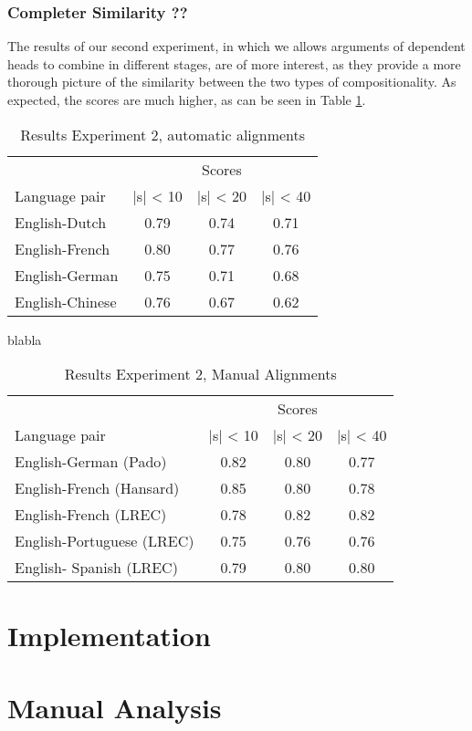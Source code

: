 \documentclass{report}
\begin{document}
\subsection{Completer Similarity ??}

The results of our second experiment, in which we allows arguments of dependent heads to combine in different stages, are of more interest, as they provide a more thorough picture of the similarity between the two types of compositionality. As expected, the scores are much higher, as can be seen in Table \ref{tab:scores3}.

\begin{table}[!h]
\centering
\begin{tabular}{l|ccc}
& \multicolumn{3}{c}{Scores}\\
Language pair & |s| < 10 & |s| < 20 & |s| < 40\\
\hline
English-Dutch & 0.79 & 0.74 & 0.71 \\
English-French & 0.80 & 0.77 & 0.76\\
English-German & 0.75 & 0.71 & 0.68 \\
English-Chinese & 0.76 & 0.67 & 0.62\\
\end{tabular}
\caption{Results Experiment 2, automatic alignments}\label{tab:scores3}
\end{table}

blabla

\begin{table}[!h]
\centering
\begin{tabular}{l|ccc}
& \multicolumn{3}{c}{Scores}\\
Language pair & |s| < 10 & |s| < 20 & |s| < 40\\
\hline
English-German (Pado) & 0.82 & 0.80 & 0.77 \\
English-French (Hansard) & 0.85 & 0.80 & 0.78 \\
English-French (LREC) & 0.78 & 0.82 & 0.82 \\
English-Portuguese (LREC) & 0.75 & 0.76 & 0.76 \\
English- Spanish (LREC) & 0.79 & 0.80 & 0.80\\
\end{tabular}
\caption{Results Experiment 2, Manual Alignments}\label{tab:scores2}
\end{table}


\appendix
\chapter{Implementation}
\label{appendix:impl}

\chapter{Manual Analysis}
\label{appendix:analysis}




\end{document}
